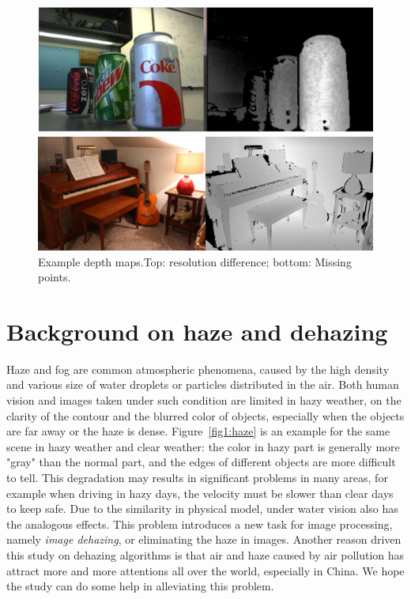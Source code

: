 \begin{figure}
\begin{minipage}[b]{0.95\linewidth}
\centering
\includegraphics[width = 12cm]{depth_interp/misc/lr_hr.JPG}
\end{minipage}
\vfill
\vspace{0.1in}
\begin{minipage}[b]{0.95\linewidth}
\centering
\includegraphics[width = 12cm]{depth_interp/misc/hole.jpg}
\end{minipage}
\caption{Example depth maps.Top: resolution difference; bottom: Missing points. }
\label{fig1:examp_img}
\end{figure}

\section{Background on haze and dehazing}
\label{sec:1.2.dehaze}
Haze and fog are common atmospheric phenomena, caused by the high density and various size of water droplets or particles distributed in the air. Both human vision and images taken under such condition are limited in hazy weather, on the clarity of the contour and the blurred color of objects, especially when the objects are far away or the haze is dense. Figure~\ref{fig1:haze} is an example for the same scene in hazy weather and clear weather: the color in hazy part is generally more "gray" than the normal part, and the edges of different objects are more difficult to tell. This degradation may results in significant problems in many areas, for example when driving in hazy days, the velocity must be slower than clear days to keep safe. Due to the similarity in physical model, under water vision also has the analogous effects. This problem introduces a new task for image processing, namely {\em image dehazing}, or eliminating the haze in images. Another reason driven this study on dehazing algorithms is that air and haze caused by air pollution has attract more and more attentions all over the world, especially in China. We hope the study can do some help in alleviating this problem. 

